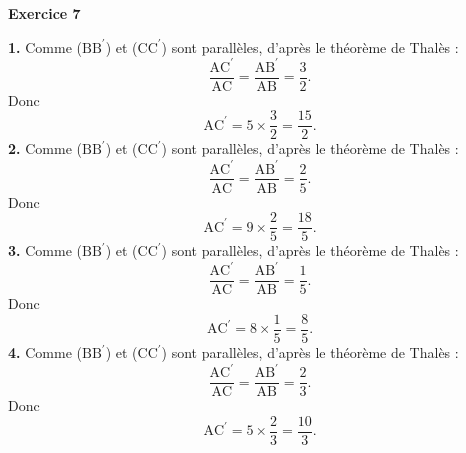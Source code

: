 \documentclass[12pt,a4paper,french]{article}
\begin{document}
\noindent\textbf{Exercice 7}\par
\smallskip
\textbf{1.} Comme (\ensuremath{\mathrm{B}}\ensuremath{\mathrm{B}^\prime}) et (\ensuremath{\mathrm{C}}\ensuremath{\mathrm{C}^\prime}) sont parallèles, d'après le théorème de Thalès : \[\dfrac{\ensuremath{\mathrm{A}}\ensuremath{\mathrm{C}^\prime}}{\ensuremath{\mathrm{A}}\ensuremath{\mathrm{C}}}=\dfrac{\ensuremath{\mathrm{A}}\ensuremath{\mathrm{B}^\prime}}{\ensuremath{\mathrm{A}}\ensuremath{\mathrm{B}}}=\dfrac{3}{2}.\]Donc \[\ensuremath{\mathrm{A}}\ensuremath{\mathrm{C}^\prime}=5\times\dfrac{3}{2}=\dfrac{15}{2}.\]\medskip
\textbf{2.} Comme (\ensuremath{\mathrm{B}}\ensuremath{\mathrm{B}^\prime}) et (\ensuremath{\mathrm{C}}\ensuremath{\mathrm{C}^\prime}) sont parallèles, d'après le théorème de Thalès : \[\dfrac{\ensuremath{\mathrm{A}}\ensuremath{\mathrm{C}^\prime}}{\ensuremath{\mathrm{A}}\ensuremath{\mathrm{C}}}=\dfrac{\ensuremath{\mathrm{A}}\ensuremath{\mathrm{B}^\prime}}{\ensuremath{\mathrm{A}}\ensuremath{\mathrm{B}}}=\dfrac{2}{5}.\]Donc \[\ensuremath{\mathrm{A}}\ensuremath{\mathrm{C}^\prime}=9\times\dfrac{2}{5}=\dfrac{18}{5}.\]\medskip
\textbf{3.} Comme (\ensuremath{\mathrm{B}}\ensuremath{\mathrm{B}^\prime}) et (\ensuremath{\mathrm{C}}\ensuremath{\mathrm{C}^\prime}) sont parallèles, d'après le théorème de Thalès : \[\dfrac{\ensuremath{\mathrm{A}}\ensuremath{\mathrm{C}^\prime}}{\ensuremath{\mathrm{A}}\ensuremath{\mathrm{C}}}=\dfrac{\ensuremath{\mathrm{A}}\ensuremath{\mathrm{B}^\prime}}{\ensuremath{\mathrm{A}}\ensuremath{\mathrm{B}}}=\dfrac{1}{5}.\]Donc \[\ensuremath{\mathrm{A}}\ensuremath{\mathrm{C}^\prime}=8\times\dfrac{1}{5}=\dfrac{8}{5}.\]\medskip
\textbf{4.} Comme (\ensuremath{\mathrm{B}}\ensuremath{\mathrm{B}^\prime}) et (\ensuremath{\mathrm{C}}\ensuremath{\mathrm{C}^\prime}) sont parallèles, d'après le théorème de Thalès : \[\dfrac{\ensuremath{\mathrm{A}}\ensuremath{\mathrm{C}^\prime}}{\ensuremath{\mathrm{A}}\ensuremath{\mathrm{C}}}=\dfrac{\ensuremath{\mathrm{A}}\ensuremath{\mathrm{B}^\prime}}{\ensuremath{\mathrm{A}}\ensuremath{\mathrm{B}}}=\dfrac{2}{3}.\]Donc \[\ensuremath{\mathrm{A}}\ensuremath{\mathrm{C}^\prime}=5\times\dfrac{2}{3}=\dfrac{10}{3}.\]\medskip
\medskip
\end{document}
